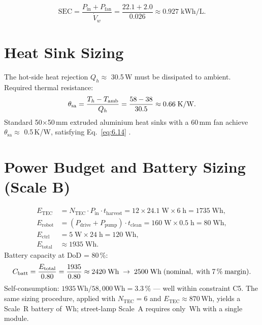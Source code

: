 \documentclass[12pt,a4paper]{report}
\numberwithin{equation}{chapter}
\numberwithin{figure}{chapter}
\numberwithin{table}{chapter}
\begin{document}
\begin{equation}
  \mathrm{SEC} = \frac{P_\mathrm{in} + P_\mathrm{fan}}{\dot{V}_w}
  = \frac{22.1 + 2.0}{0.026} \approx 0.927\;\mathrm{kWh/L}.
  \label{eq:6.13}
\end{equation}

\section{Heat Sink Sizing}

The hot-side heat rejection $Q_h \approx$ 30.5\,W must be dissipated to ambient.
Required thermal resistance:
\begin{equation}
  \theta_\mathrm{sa} = \frac{T_h - T_\mathrm{amb}}{Q_h}
  = \frac{58 - 38}{30.5}
  \approx 0.66\;\mathrm{K/W}.
  \label{eq:6.14}
\end{equation}
Standard 50$\times$50\,mm extruded aluminium heat sinks with a 60\,mm fan achieve
$\theta_\mathrm{sa} \approx$ 0.5\,K/W, satisfying Eq.~\eqref{eq:6.14}
\cite{lin2022heatsink}.

\section{Power Budget and Battery Sizing (Scale B)}

\begin{align}
  E_\mathrm{TEC}   &= N_\mathrm{TEC} \cdot P_\mathrm{in} \cdot t_\mathrm{harvest}
    = 12 \times 24.1\;\mathrm{W} \times 6\;\mathrm{h} = 1735\;\mathrm{Wh}, \label{eq:6.15}\\
  E_\mathrm{robot} &= (P_\mathrm{drive} + P_\mathrm{pump}) \cdot t_\mathrm{clean}
    = 160\;\mathrm{W} \times 0.5\;\mathrm{h} = 80\;\mathrm{Wh},            \label{eq:6.16}\\
  E_\mathrm{ctrl}  &= 5\;\mathrm{W} \times 24\;\mathrm{h} = 120\;\mathrm{Wh},      \label{eq:6.17}\\
  E_\mathrm{total} &\approx 1935\;\mathrm{Wh}.                                      \label{eq:6.18}
\end{align}
Battery capacity at DoD = 80\,\%:
\begin{equation}
  C_\mathrm{batt} = \frac{E_\mathrm{total}}{0.80}
  = \frac{1935}{0.80} \approx 2420\;\mathrm{Wh}
  \;\rightarrow\; 2500\;\mathrm{Wh\;(nominal,\;with\;7\,\%\;margin)}.
  \label{eq:6.19}
\end{equation}
Self-consumption: $1935\,\mathrm{Wh} / 58{,}000\,\mathrm{Wh} = 3.3\,\%$
--- well within constraint C5. The same sizing procedure, applied with $N_\mathrm{TEC}=6$
and $E_\mathrm{TEC}\approx 870$\,Wh, yields a Scale~R battery of \ScaleRBattWh\,Wh;
street-lamp Scale~A requires only \ScaleABattWh\,Wh with a single module.
\end{document}
